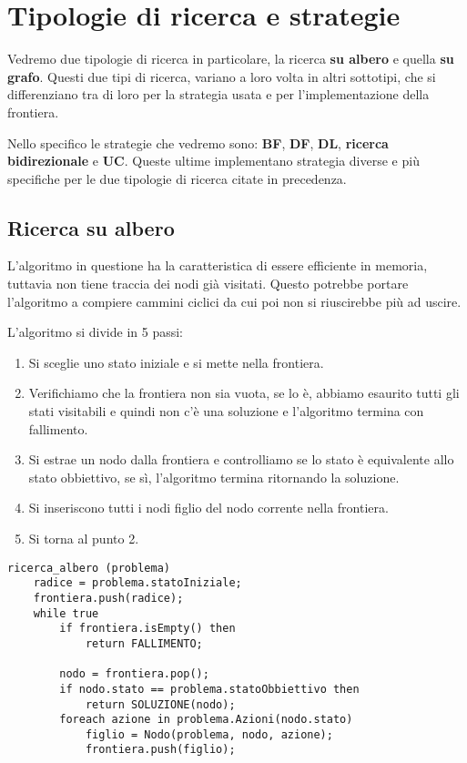 \section{Tipologie di ricerca e strategie}
Vedremo due tipologie di ricerca in particolare, la ricerca \textbf{su albero} e quella
\textbf{su grafo}. Questi due tipi di ricerca, variano a loro volta in altri sottotipi,
che si differenziano tra di loro per la strategia usata e per l'implementazione della
frontiera.

Nello specifico le strategie che vedremo sono: \textbf{BF}, \textbf{DF}, \textbf{DL},
\textbf{ricerca bidirezionale} e \textbf{UC}. Queste ultime implementano strategia
diverse e pi\`u specifiche per le due tipologie di ricerca citate in precedenza.

\subsection{Ricerca su albero}
L'algoritmo in questione ha la caratteristica di essere efficiente in memoria, tuttavia
non tiene traccia dei nodi gi\`a visitati. Questo potrebbe portare l'algoritmo a compiere
cammini ciclici da cui poi non si riuscirebbe pi\`u ad uscire.

L'algoritmo si divide in 5 passi:
\begin{enumerate}
	\item Si sceglie uno stato iniziale e si mette nella frontiera.
	\item Verifichiamo che la frontiera non sia vuota, se lo \`e, abbiamo esaurito tutti gli
	      stati visitabili e quindi non c'\`e una soluzione e l'algoritmo termina con
	      fallimento.
	\item Si estrae un nodo dalla frontiera e controlliamo se lo stato \`e equivalente allo
	      stato obbiettivo, se s\`i, l'algoritmo termina ritornando la soluzione.
	\item Si inseriscono tutti i nodi figlio del nodo corrente nella frontiera.
	\item Si torna al punto 2.
\end{enumerate}

\begin{lstlisting}[style=pseudo-style]
ricerca_albero (problema)
	radice = problema.statoIniziale;
	frontiera.push(radice);
	while true
		if frontiera.isEmpty() then
			return FALLIMENTO;

		nodo = frontiera.pop();
		if nodo.stato == problema.statoObbiettivo then
			return SOLUZIONE(nodo);
		foreach azione in problema.Azioni(nodo.stato)
			figlio = Nodo(problema, nodo, azione);
			frontiera.push(figlio);
\end{lstlisting}

